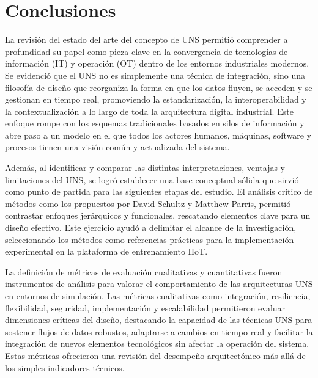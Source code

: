 \section{Conclusiones}

La revisión del estado del arte del concepto de UNS permitió comprender a profundidad su papel como pieza clave en la convergencia de tecnologías de información (IT) y operación (OT) dentro de los entornos industriales modernos. Se evidenció que el UNS no es simplemente una técnica de integración, sino una filosofía de diseño que reorganiza la forma en que los datos fluyen, se acceden y se gestionan en tiempo real, promoviendo la estandarización, la interoperabilidad y la contextualización a lo largo de toda la arquitectura digital industrial. Este enfoque rompe con los esquemas tradicionales basados en silos de información y abre paso a un modelo en el que todos los actores humanos, máquinas, software y procesos tienen una visión común y actualizada del sistema.

Además, al identificar y comparar las distintas interpretaciones, ventajas y limitaciones del UNS, se logró establecer una base conceptual sólida que sirvió como punto de partida para las siguientes etapas del estudio. El análisis crítico de métodos como los propuestos por David Schultz y Matthew Parris, permitió contrastar enfoques jerárquicos y funcionales, rescatando elementos clave para un diseño efectivo. Este ejercicio ayudó a delimitar el alcance de la investigación, seleccionando los métodos como referencias prácticas para la implementación experimental en la plataforma de entrenamiento IIoT.


La definición de métricas de evaluación cualitativas y cuantitativas fueron instrumentos de análisis para valorar el comportamiento de las arquitecturas UNS en entornos de simulación. Las métricas cualitativas como integración, resiliencia, flexibilidad, seguridad, implementación y escalabilidad permitieron evaluar dimensiones críticas del diseño, destacando la capacidad de las técnicas UNS para sostener flujos de datos robustos, adaptarse a cambios en tiempo real y facilitar la integración de nuevos elementos tecnológicos sin afectar la operación del sistema. Estas métricas ofrecieron una revisión del desempeño arquitectónico más allá de los simples indicadores técnicos.

